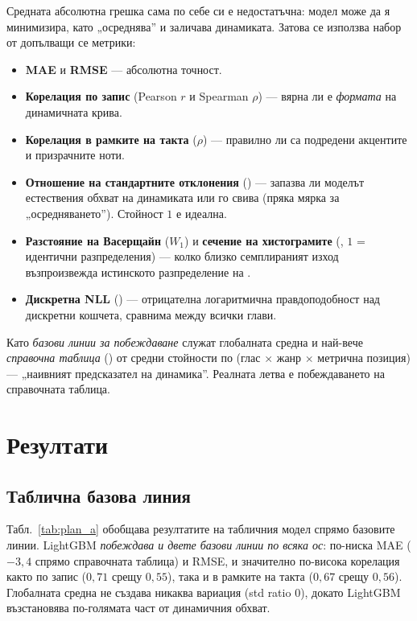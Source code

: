 Средната абсолютна грешка сама по себе си е недостатъчна: модел може да я
минимизира, като „осреднява'' и заличава динамиката. Затова се използва набор от
допълващи се метрики:
\begin{itemize}
  \item \textbf{MAE} и \textbf{RMSE} — абсолютна точност.
  \item \textbf{Корелация по запис} (Pearson $r$ и Spearman $\rho$) — вярна ли е
        \emph{формата} на динамичната крива.
  \item \textbf{Корелация в рамките на такта} ($\rho$) — правилно ли са подредени
        акцентите и призрачните ноти.
  \item \textbf{Отношение на стандартните отклонения} () — запазва
        ли моделът естествения обхват на динамиката или го свива (пряка мярка за
        „осредняването''). Стойност $1$ е идеална.
  \item \textbf{Разстояние на Васерщайн} ($W_1$) и \textbf{сечение на хистограмите}
        (, $1$ = идентични разпределения) — колко близко семплираният
        изход възпроизвежда истинското разпределение на .
  \item \textbf{Дискретна NLL} () — отрицателна логаритмична
        правдоподобност над дискретни кошчета, сравнима между всички глави.
\end{itemize}
Като \emph{базови линии за побеждаване} служат глобалната средна  и
най-вече \emph{справочна таблица} () от средни стойности по
(глас $\times$ жанр $\times$ метрична позиция) — „наивният предсказател на динамика''. Реалната
летва е побеждаването на справочната таблица.

\section{Резултати}
\label{sec:rezultati}

\subsection{Таблична базова линия}
\label{sec:rez-a}

Табл.~\ref{tab:plan_a} обобщава резултатите на табличния модел спрямо базовите
линии. LightGBM \emph{побеждава и двете базови линии по всяка ос}: по-ниска MAE
($-3{,}4$ спрямо справочната таблица) и RMSE, и значително по-висока корелация
както по запис ($0{,}71$ срещу $0{,}55$), така и в рамките на такта ($0{,}67$
срещу $0{,}56$). Глобалната средна не създава никаква вариация (std ratio $0$),
докато LightGBM възстановява по-голямата част от динамичния обхват.

